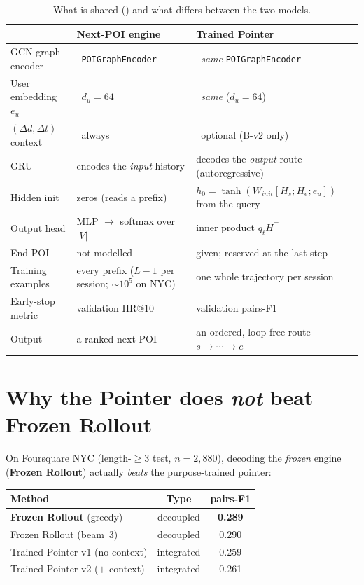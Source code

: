 \documentclass[11pt]{article}
\newcommand{\yes}{\textcolor{svGreen}{\ding{51}}}
\begin{document}


\begin{table}[h]
\centering\small
\renewcommand{\arraystretch}{1.25}
\begin{tabular}{>{\raggedright\arraybackslash}p{3.5cm} >{\raggedright\arraybackslash}p{5.0cm} >{\raggedright\arraybackslash}p{5.0cm}}
\toprule
& \textbf{Next-POI engine} & \textbf{Trained Pointer} \\
\midrule
GCN graph encoder      & \yes\ \texttt{POIGraphEncoder} & \yes\ \emph{same} \texttt{POIGraphEncoder} \\
User embedding $e_u$   & \yes\ $d_u=64$ & \yes\ \emph{same} ($d_u=64$) \\
$(\Delta d,\Delta t)$ context & \yes\ always & \yes\ optional (B-v2 only) \\
GRU                    & encodes the \emph{input} history & decodes the \emph{output} route (autoregressive) \\
Hidden init            & zeros (reads a prefix) & $h_0=\tanh(W_{init}[H_s;H_e;e_u])$ from the query \\
Output head            & \textcolor{svBlue}{MLP $\to$ softmax over $|V|$} & \textcolor{svOrange}{inner product $q_t H^\top$} \\
End POI                & not modelled & given; reserved at the last step \\
Training examples      & every prefix ($L\!-\!1$ per session; $\sim$$10^5$ on NYC) & one whole trajectory per session \\
Early-stop metric      & validation HR@10 & validation pairs-F1 \\
Output                 & a ranked next POI & an ordered, loop-free route $s\!\to\!\cdots\!\to\!e$ \\
\bottomrule
\end{tabular}
\caption{What is shared (\yes) and what differs between the two models.}
\label{tab:cmp}
\end{table}

\section{Why the Pointer does \emph{not} beat Frozen Rollout}

On Foursquare NYC (length-$\ge\!3$ test, $n=2{,}880$), decoding the \emph{frozen} engine
(\textbf{Frozen Rollout}) actually \emph{beats} the purpose-trained pointer:

\begin{center}\small
\begin{tabular}{lcc}
\toprule
Method & Type & pairs-F1 \\
\midrule
\textbf{Frozen Rollout} (greedy) & decoupled & \textbf{0.289} \\
Frozen Rollout (beam~3) & decoupled & 0.290 \\
Trained Pointer v1 (no context) & integrated & 0.259 \\
Trained Pointer v2 ($+$ context) & integrated & 0.261 \\
\bottomrule
\end{tabular}
\end{center}
\end{document}

